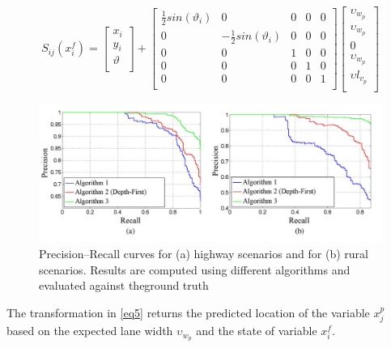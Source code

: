 \documentclass[conference]{IEEEtran}
\begin{document}
\begin{equation}
\label{eq5}
S_{ij}(x_i^f) = \begin{bmatrix}
x_i \\
y_i \\
\vartheta \\
\end{bmatrix}
+ \begin{bmatrix}
\frac{1}{2}sin(\vartheta_i) & 0 & 0 & 0 & 0 \\
0 & -\frac{1}{2}sin(\vartheta_i) & 0 &0 & 0 \\
0 & 0 & 1 & 0 & 0 \\
0 & 0 & 0 & 1 & 0 \\
0 & 0 & 0 & 0 & 1 \\
\end{bmatrix}
\begin{bmatrix}
\upsilon_{w_p} \\
\upsilon_{w_p} \\
0 \\
\upsilon_{w_p} \\
\upsilon l_{v_p} \\
\end{bmatrix}
\end{equation}

\begin{figure}
	\centering
    \includegraphics[scale = 0.4]{pictures/roc.pdf}
	\caption{Precision–Recall curves for (a) highway scenarios and for (b) rural scenarios. Results are computed using different algorithms and evaluated against theground truth\cite{lanesystem}}
	\label{fig12}
\end{figure}


The transformation in \ref{eq5} returns the predicted location of the variable $x_j^p$ based on the expected lane width $\upsilon_{w_p}$ and the state of variable $x_i^f$. 
\end{document}
